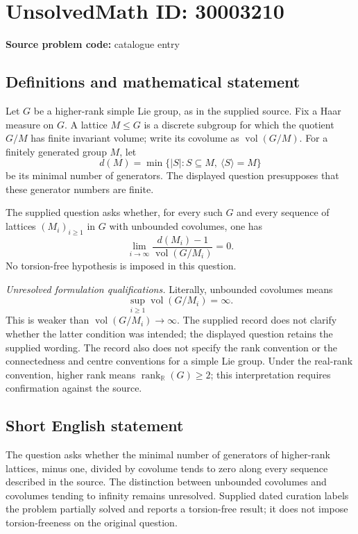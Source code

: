 \documentclass[11pt]{article}
\newcommand{\R}{\mathbb{R}}
\begin{document}
\section*{UnsolvedMath ID: 30003210}
\textbf{Source problem code:} catalogue entry
\subsection{Definitions and mathematical statement}
Let \(G\) be a higher-rank simple Lie group, as in the supplied source. Fix a Haar measure on \(G\). A lattice \(M\leq G\) is a discrete subgroup for which the quotient \(G/M\) has finite invariant volume; write its covolume as \(\operatorname{vol}(G/M)\). For a finitely generated group \(M\), let
\[
d(M)=\min\{\lvert S\rvert:S\subseteq M,\ \langle S\rangle=M\}
\]
be its minimal number of generators. The displayed question presupposes that these generator numbers are finite.

The supplied question asks whether, for every such \(G\) and every sequence of lattices \((M_i)_{i\geq1}\) in \(G\) with unbounded covolumes, one has
\[
\lim_{i\to\infty}\frac{d(M_i)-1}{\operatorname{vol}(G/M_i)}=0.
\]
No torsion-free hypothesis is imposed in this question.

\textit{Unresolved formulation qualifications.} Literally, unbounded covolumes means
\[
\sup_{i\geq1}\operatorname{vol}(G/M_i)=\infty.
\]
This is weaker than \(\operatorname{vol}(G/M_i)\to\infty\). The supplied record does not clarify whether the latter condition was intended; the displayed question retains the supplied wording. The record also does not specify the rank convention or the connectedness and centre conventions for a simple Lie group. Under the real-rank convention, higher rank means \(\operatorname{rank}_{\R}(G)\geq2\); this interpretation requires confirmation against the source.
\subsection{Short English statement}
The question asks whether the minimal number of generators of higher-rank lattices, minus one, divided by covolume tends to zero along every sequence described in the source. The distinction between unbounded covolumes and covolumes tending to infinity remains unresolved. Supplied dated curation labels the problem partially solved and reports a torsion-free result; it does not impose torsion-freeness on the original question.
\end{document}
